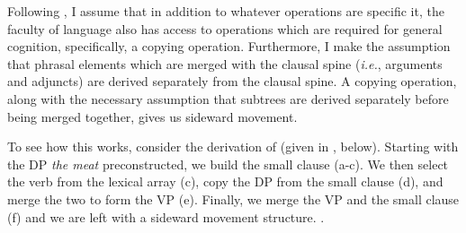 \documentclass[letterpaper,12pt]{article}
\begin{document}
Following \textcite{hornstein2009theory,nunes2001sideward}, I assume that in addition to whatever operations are specific it, the faculty of language also has access to operations which are required for general cognition, specifically, a copying operation.
Furthermore, I make the assumption that phrasal elements which are merged with the clausal spine (\textit{i.e.}, arguments and adjuncts) are derived separately from the clausal spine.
A copying operation, along with the necessary assumption that subtrees are derived separately before being merged together, gives us sideward movement.

To see how this works, consider the derivation of \Last (given in \Next, below).
Starting with the DP \textit{the meat} preconstructed, we build the small clause (a-c).
We then select the verb from the lexical array (c), copy the DP from the small clause (d), and merge the two to form the VP (e).
Finally, we merge the VP and the small clause (f) and we are left with a sideward movement structure.
\ex.
\end{document}
